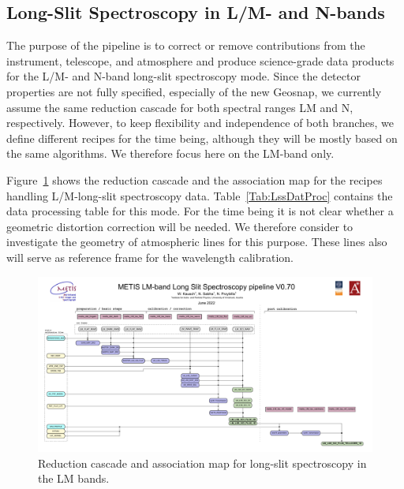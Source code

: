 \subsection{Long-Slit Spectroscopy in L/M- and N-bands}

The purpose of the pipeline is to correct or remove contributions from
the instrument, telescope, and atmosphere and produce science-grade
data products for the L/M- and N-band long-slit spectroscopy
mode. Since the detector properties are not fully specified, especially of the new Geosnap, we currently assume
the same reduction cascade for both spectral ranges LM and
N, respectively. However, to keep flexibility and independence of both branches, we
define different recipes for the time being, although they will be
mostly based on the same algorithms. We therefore focus here on the LM-band only.

Figure~\ref{Fig:LMLssAssomap} shows the reduction cascade and the association map for the recipes handling L/M-long-slit
spectroscopy data.  Table~\ref{Tab:LssDatProc} contains the data processing table for this mode. For the time being it is not clear whether a geometric
distortion correction will be needed. We therefore consider to investigate
the geometry of atmospheric lines for this purpose. These lines also will
serve as reference frame for the wavelength calibration.

\begin{figure}
  \centering
  \includegraphics[width=0.9\textheight]{figures/LM_LSS_pipeline_wf_draft_latest_v0.70.pdf}
  \caption[Reduction cascade and association map for LM long-slit
  spectroscopy]{Reduction cascade and association map for long-slit
    spectroscopy in the LM bands.  }
  \label{Fig:LMLssAssomap}
\end{figure}



